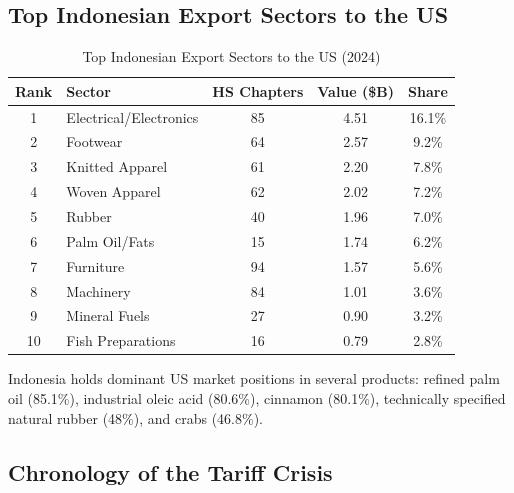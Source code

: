 \documentclass[12pt,a4paper]{article}
\begin{document}
\subsection{Top Indonesian Export Sectors to the US}

\begin{table}[htbp]
\centering
\caption{Top Indonesian Export Sectors to the US (2024)}
\begin{tabular}{clccc}
\toprule
\textbf{Rank} & \textbf{Sector} & \textbf{HS Chapters} & \textbf{Value (\$B)} & \textbf{Share} \\
\midrule
1 & Electrical/Electronics & 85 & 4.51 & 16.1\% \\
2 & Footwear & 64 & 2.57 & 9.2\% \\
3 & Knitted Apparel & 61 & 2.20 & 7.8\% \\
4 & Woven Apparel & 62 & 2.02 & 7.2\% \\
5 & Rubber & 40 & 1.96 & 7.0\% \\
6 & Palm Oil/Fats & 15 & 1.74 & 6.2\% \\
7 & Furniture & 94 & 1.57 & 5.6\% \\
8 & Machinery & 84 & 1.01 & 3.6\% \\
9 & Mineral Fuels & 27 & 0.90 & 3.2\% \\
10 & Fish Preparations & 16 & 0.79 & 2.8\% \\
\bottomrule
\end{tabular}
\end{table}

Indonesia holds dominant US market positions in several products: refined palm oil (85.1\%), industrial oleic acid (80.6\%), cinnamon (80.1\%), technically specified natural rubber (48\%), and crabs (46.8\%).

\subsection{Chronology of the Tariff Crisis}
\end{document}
